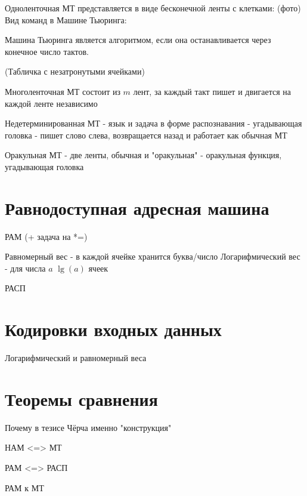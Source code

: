 Одноленточная МТ представляется в виде бесконечной ленты с клетками:
(фото)
Вид команд в Машине Тьюринга:


\begin{definition}
  Машина Тьюринга является алгоритмом, если она останавливается через конечное число тактов.
\end{definition}

(Табличка с незатронутыми ячейками)

Многоленточная МТ состоит из \(m\) лент, за каждый такт пишет и двигается на каждой ленте независимо

Недетерминированная МТ
- язык и задача в форме распознавания
- угадывающая головка
- пишет слово слева, возвращается назад и работает как обычная МТ

Оракульная МТ
- две ленты, обычная и "оракульная"
- оракульная функция, угадывающая головка

\section{Равнодоступная адресная машина}

РАМ (+ задача на *=)

Равномерный вес - в каждой ячейке хранится буква/число
Логарифмический вес - для числа \(a\) \(\lg(a)\) ячеек

РАСП

\section{Кодировки входных данных}

Логарифмический и равномерный веса

\section{Теоремы сравнения}

Почему в тезисе Чёрча именно "конструкция"

НАМ <=> МТ

РАМ <=> РАСП

РАМ к МТ
